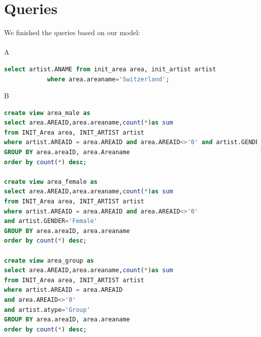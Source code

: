 \documentclass[11pt]{article} %
\begin{document}
\normalsize{
\section{Queries}
We finished the queries based on our model: \\ \\
A
\begin{lstlisting}[language=SQL, keywordstyle=\color{blue!70},
commentstyle=\color{red!50!green!50!blue!50},
rulesepcolor=\color{red!20!green!20!blue!20},
frame=shadowbox]
select artist.ANAME from init_area area, init_artist artist
			where area.areaname='Switzerland';
\end{lstlisting}
B
\begin{lstlisting}[language=SQL, keywordstyle=\color{blue!70},
commentstyle=\color{red!50!green!50!blue!50},
rulesepcolor=\color{red!20!green!20!blue!20},
frame=shadowbox]
create view area_male as
select area.AREAID,area.areaname,count(*)as sum
from INIT_Area area, INIT_ARTIST artist
where artist.AREAID = area.AREAID and area.AREAID<>'0' and artist.GENDER='Male'
GROUP BY area.areaID, area.Areaname
order by count(*) desc;

create view area_female as
select area.AREAID,area.areaname,count(*)as sum
from INIT_Area area, INIT_ARTIST artist
where artist.AREAID = area.AREAID and area.AREAID<>'0'
and artist.GENDER='Female'
GROUP BY area.areaID, area.areaname
order by count(*) desc;

create view area_group as
select area.AREAID,area.areaname,count(*)as sum
from INIT_Area area, INIT_ARTIST artist
where artist.AREAID = area.AREAID
and area.AREAID<>'0'
and artist.atype='Group'
GROUP BY area.areaID, area.areaname
order by count(*) desc;


\end{lstlisting}}
\end{document}
